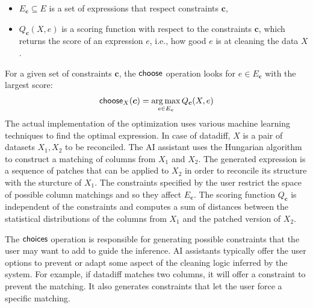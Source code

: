 \documentclass[anonymous, a4paper,UKenglish,cleveref, autoref, thm-restate]{lipics-v2021}
\newcommand{\ident}[1]{\textsf{#1}}
\newcommand{\select}{\textnormal{\ident{choose}}}
\newcommand{\choices}{\textnormal{\ident{choices}}}
\DeclareMathOperator{\argmax}{arg\,max}
\begin{document}
\vspace{-0.25em}
\begin{itemize}
\item $E_{\boldsymbol{c}}\subseteq E$ is a set of expressions that respect constraints $\boldsymbol{c}$,
\item $Q_{\boldsymbol{c}}(X, e)$ is a scoring function with respect to the constraints $\boldsymbol{c}$,
  which returns the score of an expression $e$, i.e., how good $e$ is at cleaning the data $X$.
\end{itemize}
\vspace{-0.25em}

\noindent
For a given set of constraints $\boldsymbol{c}$, the $\select$ operation looks
for $e\in E_{\boldsymbol{c}}$ with the largest score:
\[
\select_X(\boldsymbol{c}) = \argmax_{e \in E_{\boldsymbol{c}}} Q_{\boldsymbol{c}}(X, e)
\]
The actual implementation of the optimization uses various machine learning techniques to
find the optimal expression. In case of datadiff, $X$ is a pair of datasets $X_1, X_2$ to be
reconciled. The AI assistant uses the Hungarian algorithm \cite{sutton-2018-datadiff} to construct
a matching of columns from $X_1$ and $X_2$. The generated expression is a sequence of patches
that can be applied to $X_2$ in order to reconcile its structure with the sturcture of $X_1$.
The constraints specified by the user restrict the space of possible column matchings and so they
affect $E_{\boldsymbol{c}}$. The scoring function $Q_{\boldsymbol{c}}$ is independent of
the constraints and computes a sum of distances between the statistical distributions of the
columns from $X_1$ and the patched version of $X_2$.

The $\choices$ operation is responsible for generating possible constraints that the user may
want to add to guide the inference. AI assistants typically offer the user options to prevent
or adapt some aspect of the cleaning logic inferred by the system. For example, if datadiff
matches two columns, it will offer a constraint to prevent the matching. It also generates
constraints that let the user force a specific matching.
\end{document}
